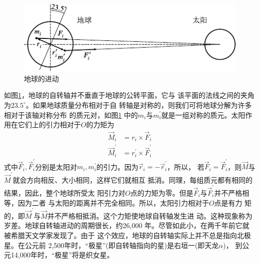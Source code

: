 \vspace{1.5em}
\begin{figure}[h]
    \centering
    \includegraphics{figure/fig10.23}
    \caption{地球的进动}
    \label{fig:10.23}
\end{figure}

如图\ref{fig:10.23}，地球的自转轴并不垂直于地球的公转平面，它与
该平面的法线之间的夹角为$ 23.5 ^ \circ $。如果地球质量分布相对于自
转轴是对称的，则我们可将地球分解为许多相对于该轴对称分布
的质元对，如图\ref{fig:10.23} 中的$ m _ i $与$ m _ i ^ \prime $就是一组对称的质元。太阳作
用在它们上的引力相对于$ O $的力矩为
\begin{equation*}
    \begin{split}
        \vec{M} _ { i } &= r _ { i } \times \vec{F} _ i \\
        \vec{M} _ { i } ^ { \prime } &= r _ { i } ^ { \prime } \times \vec{F} _ i ^ \prime
    \end{split}
\end{equation*}
式中$ \vec{F} _ i,  \vec{F} _ i ^ \prime$分别是太阳对$ m _ i , m _ i ^ \prime $的引力。因为$ \vec{r} _ i = - \vec{r} _i ^ \prime $，所以，
若$ \vec{F} _ i = \vec{F} _ i ^ \prime $，则$\vec{M}$与$\vec{M} ^ \prime$就会方向相反、大小相同，这样它们就相互
抵消。同理，每组质元都有相同的结果，因此，整个地球所受太
阳引力对$ O $点的力矩为零。但是$ \vec{F} _ i $与$ \vec{F} _ i ^ \prime $并不严格相等，因为二者
与太阳的距离并不完全相同。所以，太阳引力相对于$ O $点是有力
矩的，即$\vec{M} ^ \prime$与$\vec{M}$并不严格相抵消。这个力矩使地球自转轴发生进
动。这种现象称为岁差。地球自转轴进动的周期很长，约26,000
年。尽管如此小，在两千年前它就被希腊天文学家发现了。由于
这个效应，地球的自转轴实际上并不总是指向北极星。在公元前
2,500年时，“极星”(即自转轴指向的星)是右垣一(即天龙$ \alpha $)，
到公元14,000年时，“极星”将是织女星。
